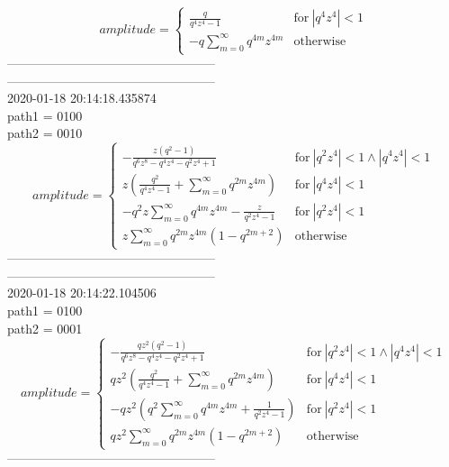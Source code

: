 $$amplitude = \begin{cases} \frac{q}{q^{4} z^{4} - 1} & \text{for}\: \left|{q^{4} z^{4}}\right| < 1 \\- q \sum_{m=0}^{\infty} q^{4 m} z^{4 m} & \text{otherwise} \end{cases}$$
--------------------------------------------------\\
--------------------------------------------------\\
2020-01-18 20:14:18.435874\\
path1 = 0100\\
path2 = 0010\\
$$amplitude = \begin{cases} - \frac{z \left(q^{2} - 1\right)}{q^{6} z^{8} - q^{4} z^{4} - q^{2} z^{4} + 1} & \text{for}\: \left|{q^{2} z^{4}}\right| < 1 \wedge \left|{q^{4} z^{4}}\right| < 1 \\z \left(\frac{q^{2}}{q^{4} z^{4} - 1} + \sum_{m=0}^{\infty} q^{2 m} z^{4 m}\right) & \text{for}\: \left|{q^{4} z^{4}}\right| < 1 \\- q^{2} z \sum_{m=0}^{\infty} q^{4 m} z^{4 m} - \frac{z}{q^{2} z^{4} - 1} & \text{for}\: \left|{q^{2} z^{4}}\right| < 1 \\z \sum_{m=0}^{\infty} q^{2 m} z^{4 m} \left(1 - q^{2 m + 2}\right) & \text{otherwise} \end{cases}$$
--------------------------------------------------\\
--------------------------------------------------\\
2020-01-18 20:14:22.104506\\
path1 = 0100\\
path2 = 0001\\
$$amplitude = \begin{cases} - \frac{q z^{2} \left(q^{2} - 1\right)}{q^{6} z^{8} - q^{4} z^{4} - q^{2} z^{4} + 1} & \text{for}\: \left|{q^{2} z^{4}}\right| < 1 \wedge \left|{q^{4} z^{4}}\right| < 1 \\q z^{2} \left(\frac{q^{2}}{q^{4} z^{4} - 1} + \sum_{m=0}^{\infty} q^{2 m} z^{4 m}\right) & \text{for}\: \left|{q^{4} z^{4}}\right| < 1 \\- q z^{2} \left(q^{2} \sum_{m=0}^{\infty} q^{4 m} z^{4 m} + \frac{1}{q^{2} z^{4} - 1}\right) & \text{for}\: \left|{q^{2} z^{4}}\right| < 1 \\q z^{2} \sum_{m=0}^{\infty} q^{2 m} z^{4 m} \left(1 - q^{2 m + 2}\right) & \text{otherwise} \end{cases}$$
--------------------------------------------------\\
